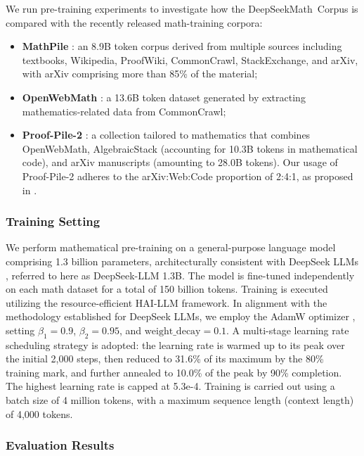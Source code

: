 \begin{itemize}[topsep=0pt]
We run pre-training experiments to investigate how the DeepSeekMath~Corpus is compared with the recently released math-training corpora:

\begin{itemize}[topsep=0pt]
    \item \textbf{MathPile} \citep{mathpile}: an 8.9B token corpus derived from multiple sources including textbooks, Wikipedia, ProofWiki, CommonCrawl, StackExchange, and arXiv, with arXiv comprising more than 85\% of the material;
    \item \textbf{OpenWebMath} \citep{openwebmath}: a 13.6B token dataset generated by extracting mathematics-related data from CommonCrawl;
    \item \textbf{Proof-Pile-2} \citep{llemma}: a collection tailored to mathematics that combines OpenWebMath, AlgebraicStack (accounting for 10.3B tokens in mathematical code), and arXiv manuscripts (amounting to 28.0B tokens). Our usage of Proof-Pile-2 adheres to the arXiv:Web:Code proportion of 2:4:1, as proposed in \cite{llemma}.
\end{itemize}

\subsubsection{Training Setting}
\label{sec:quality-policy}
We perform mathematical pre-training on a general-purpose language model comprising 1.3 billion parameters, architecturally consistent with DeepSeek LLMs \citep{deepseek-llm}, referred to here as DeepSeek-LLM 1.3B. The model is fine-tuned independently on each math dataset for a total of 150 billion tokens. Training is executed utilizing the resource-efficient HAI-LLM \citep{haillm} framework. In alignment with the methodology established for DeepSeek LLMs, we employ the AdamW optimizer \citep{adamW}, setting $\beta_1=0.9$, $\beta_2=0.95$, and $\mathrm{weight\_decay}=0.1$. A multi-stage learning rate scheduling strategy is adopted: the learning rate is warmed up to its peak over the initial 2{,}000 steps, then reduced to 31.6\% of its maximum by the 80\% training mark, and further annealed to 10.0\% of the peak by 90\% completion. The highest learning rate is capped at 5.3e-4. Training is carried out using a batch size of 4 million tokens, with a maximum sequence length (context length) of 4,000 tokens.

\subsubsection{Evaluation Results}


\end{itemize}
